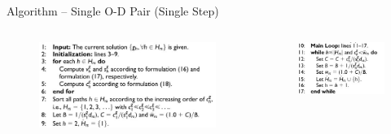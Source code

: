 \documentclass{beamer}
\begin{document}
\begin{frame}{Algorithm -- Single O-D Pair (Single Step)}
\begin{columns}
    \begin{column}{0.4\textwidth}
    \begin{figure}
    \includegraphics[width=\textwidth]{./alg11.jpg}
    \end{figure}
    \end{column}

    \begin{column}{0.2\textwidth}
    \begin{figure}
    \includegraphics[width=\textwidth]{./alg12.jpg}
    \end{figure}
    \end{column}


\end{columns}
\end{frame}
\end{document}

